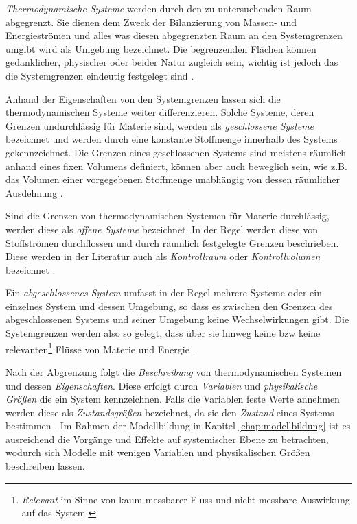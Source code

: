 \textit{Thermodynamische Systeme} werden durch den zu untersuchenden Raum abgegrenzt. Sie dienen dem Zweck der Bilanzierung von Massen- und Energieströmen und alles was diesen abgegrenzten Raum an den Systemgrenzen umgibt wird als Umgebung bezeichnet. Die begrenzenden Flächen können gedanklicher, physischer oder beider Natur zugleich sein, wichtig ist jedoch das die Systemgrenzen eindeutig festgelegt sind \cite[S.~11]{ba12}.

Anhand der Eigenschaften von den Systemgrenzen lassen sich die thermodynamischen Systeme weiter differenzieren.
Solche Systeme, deren Grenzen undurchlässig für Materie sind, werden als \textit{geschlossene Systeme} bezeichnet und werden durch eine konstante Stoffmenge innerhalb des Systems gekennzeichnet. Die Grenzen eines geschlossenen Systems sind meistens räumlich anhand eines fixen Volumens definiert, können aber auch beweglich sein, wie z.B. das Volumen einer vorgegebenen Stoffmenge unabhängig von dessen räumlicher Ausdehnung \cite[S.~12]{ba12}.

Sind die Grenzen von thermodynamischen Systemen für Materie durchlässig, werden diese als \textit{offene Systeme} bezeichnet. In der Regel werden diese von Stoffströmen durchflossen und durch räumlich festgelegte Grenzen beschrieben. Diese werden in der Literatur auch als \textit{Kontrollraum} oder \textit{Kontrollvolumen} bezeichnet \cite[S.~12]{ba12}.

Ein \textit{abgeschlossenes System} umfasst in der Regel mehrere Systeme oder ein einzelnes System und dessen Umgebung, so dass es zwischen den Grenzen des abgeschlossenen Systems und seiner Umgebung keine Wechselwirkungen gibt. Die Systemgrenzen werden also so gelegt, dass über sie hinweg keine \acrlong{bzw} keine relevanten\footnote{\textit{Relevant} im Sinne von kaum messbarer Fluss und nicht messbare Auswirkung auf das System.} Flüsse von Materie und Energie \cite[S.~13]{ba12}.

Nach der Abgrenzung folgt die \textit{Beschreibung} von thermodynamischen Systemen und dessen \textit{Eigenschaften}. Diese erfolgt durch \textit{Variablen} und \textit{physikalische Größen} die ein System kennzeichnen. Falls die Variablen feste Werte annehmen werden diese als \textit{Zustandsgrößen} bezeichnet, da sie den \textit{Zustand} eines Systems bestimmen \cite[S.~13]{ba12}. Im Rahmen der Modellbildung in Kapitel \ref{chap:modellbildung} ist es ausreichend die Vorgänge und Effekte auf systemischer Ebene zu betrachten, wodurch sich Modelle mit wenigen Variablen und physikalischen Größen beschreiben lassen.

